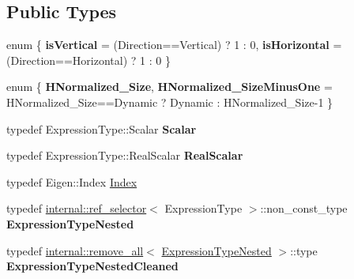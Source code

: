 \subsection*{Public Types}
\begin{DoxyCompactItemize}
\item 
\mbox{\label{class_eigen_1_1_vectorwise_op_a6558f8f5769f437ce63955d012728135}} 
enum \{ {\bfseries is\+Vertical} = (Direction==Vertical) ? 1 \+: 0, 
{\bfseries is\+Horizontal} = (Direction==Horizontal) ? 1 \+: 0
 \}
\item 
\mbox{\label{class_eigen_1_1_vectorwise_op_a4a3def00496da41fd51b7fb8daa4c19c}} 
enum \{ {\bfseries H\+Normalized\+\_\+\+Size}, 
{\bfseries H\+Normalized\+\_\+\+Size\+Minus\+One} = H\+Normalized\+\_\+\+Size==Dynamic ? Dynamic \+: H\+Normalized\+\_\+\+Size-\/1
 \}
\item 
\mbox{\label{class_eigen_1_1_vectorwise_op_a4cb7d0cf1e410781e57a4b67577941fd}} 
typedef Expression\+Type\+::\+Scalar {\bfseries Scalar}
\item 
\mbox{\label{class_eigen_1_1_vectorwise_op_aa87e1223d69489f1f016d25d99c8cf5f}} 
typedef Expression\+Type\+::\+Real\+Scalar {\bfseries Real\+Scalar}
\item 
typedef Eigen\+::\+Index \mbox{\hyperlink{class_eigen_1_1_vectorwise_op_a4907c654e5810edd98e4162093b19532}{Index}}
\item 
\mbox{\label{class_eigen_1_1_vectorwise_op_a897184183f7ca0939f1ee309a4d1a167}} 
typedef \mbox{\hyperlink{struct_eigen_1_1internal_1_1ref__selector}{internal\+::ref\+\_\+selector}}$<$ Expression\+Type $>$\+::non\+\_\+const\+\_\+type {\bfseries Expression\+Type\+Nested}
\item 
\mbox{\label{class_eigen_1_1_vectorwise_op_a737bf612fa7628a7d806bd6057b59f21}} 
typedef \mbox{\hyperlink{struct_eigen_1_1internal_1_1remove__all}{internal\+::remove\+\_\+all}}$<$ \mbox{\hyperlink{struct_eigen_1_1internal_1_1true__type}{Expression\+Type\+Nested}} $>$\+::type {\bfseries Expression\+Type\+Nested\+Cleaned}
\item 
\mbox{\label{class_eigen_1_1_vectorwise_op_a48238275ccc794871f0375896942dc14}} 

\end{DoxyCompactItemize}
